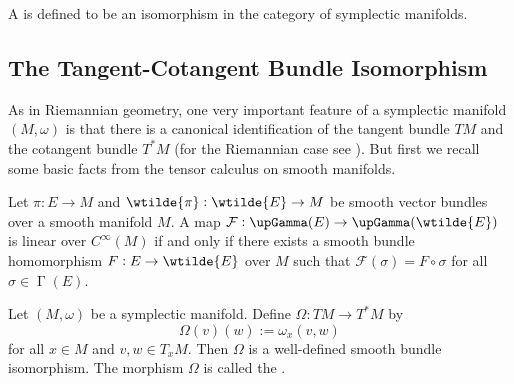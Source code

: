 \begin{definition}[Symplectomorphism]
	A  is defined to be an isomorphism in the category of symplectic manifolds.
\end{definition}

\subsection*{The Tangent-Cotangent Bundle Isomorphism}
As in Riemannian geometry, one very important feature of a symplectic manifold $(M,\omega)$ is that there is a canonical identification of the tangent bundle $TM$ and the cotangent bundle $T^*M$ (for the Riemannian case see \cite[341]{lee:smooth_manifolds:2013}). But first we recall some basic facts from the tensor calculus on smooth manifolds. 



\begin{theorem}
	\label{thm:bundle_homomorphism_characterisation_lemma}
	Let $\pi : E \to M$ and $\wtilde{\pi} : \wtilde{E} \to M$ be smooth vector bundles over a smooth manifold $M$. A map $\mathcal{F} : \upGamma(E) \to \upGamma(\wtilde{E})$ is linear over $C^\infty(M)$ if and only if there exists a smooth bundle homomorphism $F : E \to \wtilde{E}$ over $M$ such that $\mathcal{F}(\sigma) = F \circ \sigma$ for all $\sigma \in \upGamma(E)$.
\end{theorem}

\begin{proposition}
	\label{prop:tangent-cotangent_bundle_isomorphism}
	Let $(M,\omega)$ be a symplectic manifold. Define $\Omega : TM \to T^*M$ by
	\begin{equation}
		\label{eq:tangent-cotangent_isomorphism}
		\Omega(v)(w) := \omega_x(v,w)
	\end{equation}
	\noindent for all $x \in M$ and $v,w \in T_xM$. Then $\Omega$ is a well-defined smooth bundle isomorphism. The morphism $\Omega$ is called the .
\end{proposition}

